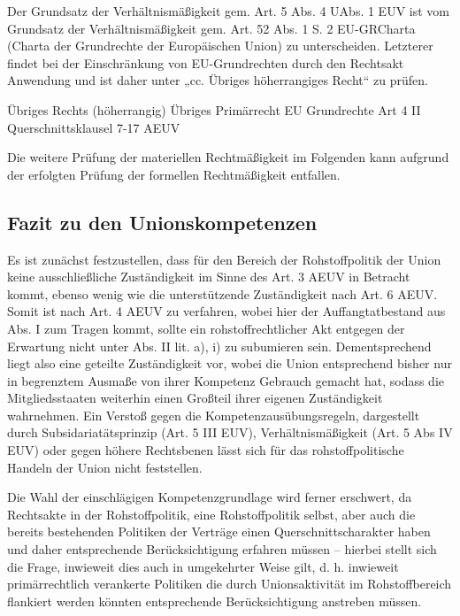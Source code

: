 \documentclass[12pt,a4paper,oneside]{book} %
\begin{document}
	Der Grundsatz der Verhältnismäßigkeit gem. Art. 5 Abs. 4 UAbs. 1 EUV ist vom Grundsatz der Verhältnismäßigkeit gem. Art. 52 Abs. 1 S. 2 EU-GRCharta (Charta der Grundrechte der Europäischen Union) zu unterscheiden. Letzterer findet bei der Einschränkung von EU-Grundrechten durch den Rechtsakt Anwendung und ist daher unter „cc. Übriges höherrangiges Recht“ zu prüfen.%
	
	Übriges Rechts (höherrangig)
	Übriges Primärrecht
	EU Grundrechte
	Art 4 II
	Querschnittsklausel 7-17 AEUV
	
	Die weitere Prüfung der materiellen Rechtmäßigkeit im Folgenden kann aufgrund der erfolgten Prüfung der formellen Rechtmäßigkeit entfallen.
	
	\subsection{Fazit zu den Unionskompetenzen}
	Es ist zunächst festzustellen, dass für den Bereich der Rohstoffpolitik der Union keine ausschließliche Zuständigkeit im Sinne des Art. 3 AEUV in Betracht kommt, ebenso wenig wie die unterstützende Zuständigkeit nach Art. 6 AEUV. Somit ist nach Art. 4 AEUV zu verfahren, wobei hier der Auffangtatbestand aus Abs. I zum Tragen kommt, sollte ein rohstoffrechtlicher Akt entgegen der Erwartung nicht unter Abs. II lit. a), i) zu subumieren sein. Dementsprechend liegt also eine geteilte Zuständigkeit vor, wobei die Union entsprechend bisher nur in begrenztem Ausmaße von ihrer Kompetenz Gebrauch gemacht hat, sodass die Mitgliedsstaaten weiterhin einen Großteil ihrer eigenen Zuständigkeit wahrnehmen. Ein Verstoß gegen die Kompetenzausübungsregeln, dargestellt durch Subsidariatätsprinzip (Art. 5 III EUV), Verhältnismäßigkeit (Art. 5 Abs IV EUV) oder gegen höhere Rechtsbenen lässt sich für das rohstoffpolitische Handeln der Union nicht feststellen.
	
	Die Wahl der einschlägigen Kompetenzgrundlage wird ferner erschwert, da Rechtsakte in der Rohstoffpolitik, eine Rohstoffpolitik selbst, aber auch die bereits bestehenden Politiken der Verträge einen Querschnittscharakter haben und daher entsprechende Berücksichtigung erfahren müssen -- hierbei stellt sich die Frage, inwieweit dies auch in umgekehrter Weise gilt, d. h. inwieweit primärrechtlich verankerte Politiken die durch Unionsaktivität im Rohstoffbereich flankiert werden könnten entsprechende Berücksichtigung anstreben müssen.
	
	
\end{document}
